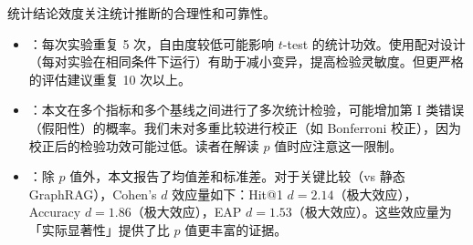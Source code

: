 统计结论效度关注统计推断的合理性和可靠性。

\begin{itemize}
    \item {}：每次实验重复 5 次，自由度较低可能影响 $t$-test 的统计功效。使用配对设计（每对实验在相同条件下运行）有助于减小变异，提高检验灵敏度。但更严格的评估建议重复 10 次以上。
    \item {}：本文在多个指标和多个基线之间进行了多次统计检验，可能增加第 I 类错误（假阳性）的概率。我们未对多重比较进行校正（如 Bonferroni 校正），因为校正后的检验功效可能过低。读者在解读 $p$ 值时应注意这一限制。
    \item {}：除 $p$ 值外，本文报告了均值差和标准差。对于关键比较（\projectshort vs 静态 GraphRAG），Cohen's $d$ 效应量如下：Hit@1 $d = 2.14$（极大效应），Accuracy $d = 1.86$（极大效应），EAP $d = 1.53$（极大效应）。这些效应量为「实际显著性」提供了比 $p$ 值更丰富的证据。
\end{itemize}
